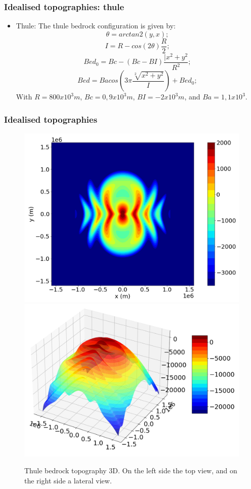 \documentclass[11pt]{beamer}
\begin{document}
\begin{frame}
	\frametitle{Idealised topographies: thule}
	\begin{itemize}
		\item Thule: The thule bedrock configuration is given by:
			\begin{equation}
			\theta=arctan2(y,x);
		\end{equation}
		\begin{equation}
			I=R-cos(2\theta)\frac{R}{2};
		\end{equation}
		\begin{equation}
			Bed_0=Bc-(Bc-BI)\frac{|x^2+y^2}{R^2};
		\end{equation}
		\begin{equation}
			Bed=Bacos(3\pi\frac{\sqrt[2]{x^2+y^2}}{I})+Bed_0;
		\end{equation}
		With $R=800 x 10^3 m$, $Bc=0,9 x 10^3 m$, $BI=-2 x 10^3 m$, and $Ba=1,1 x 10^3$.
	\end{itemize}
\end{frame}
\begin{frame}
	\frametitle{Idealised topographies}
	\begin{center}
			\begin{figure}[!h]
			\centering
			\includegraphics[width=0.45\linewidth]{../fig/Thule_2D}
			\includegraphics[width=0.45\linewidth]{../fig/Thule_3D}
			\caption{Thule bedrock topography 3D. On the left side the top view, and on the right side a lateral view.}
			\label{Thule_3D}
		\end{figure}
	\end{center}
\end{frame}
\end{document}
